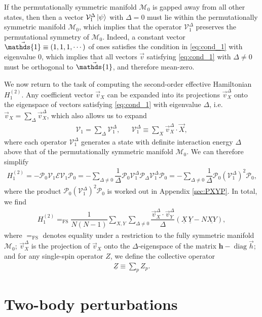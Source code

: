 \documentclass[nofootinbib,notitlepage,11pt]{revtex4-2}
\newcommand{\f}[2]{\dfrac{#1}{#2}} %
\newcommand{\p}[1]{\left(#1\right)} %
\renewcommand{\c}{\cdot} %
\newcommand{\m}{\bm} %
\renewcommand{\v}{\vec} %
\newcommand{\1}{\mathds{1}}
\newcommand{\E}{\mathcal{E}}
\newcommand{\M}{\mathcal{M}}
\renewcommand{\P}{\mathcal{P}}
\newcommand{\V}{\mathcal{V}}
\newcommand{\EQFS}{=_{\text{FS}}}
\newcommand{\col}{\underline}
\DeclareMathOperator{\diag}{diag}
\begin{document}
If the permutationally symmetric manifold $\M_0$ is gapped away from
all other states, then then a vector $\V_1^\Delta\ket\psi$ with
$\Delta=0$ must lie within the permutationally symmetric manifold
$\M_0$, which implies that the operator $\V_1^\Delta$ preserves the
permutational symmetry of $\M_0$.  Indeed, a constant vector
$\v\1\equiv\p{1,1,1,\cdots}$ of ones satisfies the condition in
\eqref{eq:cond_1} with eigenvalue $0$, which implies that all vectors
$\v v$ satisfying \eqref{eq:cond_1} with $\Delta\ne0$ must be
orthogonal to $\v\1$, and therefore mean-zero.

We now return to the task of computing the second-order effective
Hamiltonian $H_1^{(2)}$.  Any coefficient vector $\v v_X$ can be
expanded into its projections $\v v_X^\Delta$ onto the eigenspace of
vectors satisfying \eqref{eq:cond_1} with eigenvalue $\Delta$,
i.e.~$\v v_X = \sum_\Delta \v v_X^\Delta$, which also allows us to
expand
\begin{align}
  \V_1 = \sum_\Delta \V_1^\Delta,
  &&
  \V_1^\Delta \equiv \sum_X \v v_X^\Delta \c \v X,
\end{align}
where each operator $\V_1^\Delta$ generates a state with definite
interaction energy $\Delta$ above that of the permutationally
symmetric manifold $\M_0$.  We can therefore simplify
\begin{align}
  H_1^{(2)}
  = - \P_0 \V_1 \E \V_1 \P_0
  = - \sum_{\Delta\ne0} \f1{\Delta}
  \P_0 \V_1^\Delta \P_\Delta \V_1^\Delta \P_0
  = - \sum_{\Delta\ne0} \f1{\Delta} \P_0 \p{\V_1^\Delta}^2 \P_0,
\end{align}
where the product $\P_0 \p{\V_1^\Delta}^2 \P_0$ is worked out in
Appendix \ref{sec:PXYP}.  In total, we find
\begin{align}
  H_1^{(2)}
  \EQFS \f1{N\p{N-1}} \sum_{X,Y} \sum_{\Delta\ne0}
  \f{\v v_X^\Delta\c\v v_Y^\Delta}{\Delta}
  \p{\col{X}\,\col{Y} - N \col{XY}},
  \label{eq:H_1_2}
\end{align}
where $\EQFS$ denotes equality under a restriction to the fully
symmetric manifold $\M_0$; $\v v_X^\Delta$ is the projection of
$\v v_X$ onto the $\Delta$-eigenspace of the matrix $\m h-\diag\v h$;
and for any single-spin operator $Z$, we define the collective
operator
\begin{align}
  \col{Z} \equiv \sum_p Z_p.
\end{align}

\section{Two-body perturbations}
\label{sec:two_body_pert}
\end{document}
